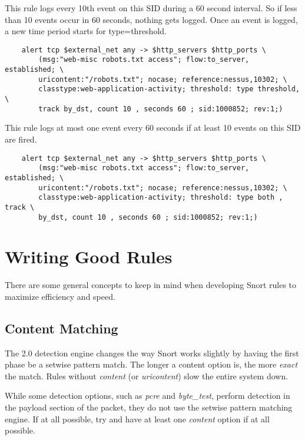 \documentclass[english]{report}
\begin{document}
This rule logs every 10th event on this SID during a 60 second interval. So if
less than 10 events occur in 60 seconds, nothing gets logged.  Once an event is
logged, a new time period starts for type=threshold.

\begin{verbatim}
    alert tcp $external_net any -> $http_servers $http_ports \
        (msg:"web-misc robots.txt access"; flow:to_server, established; \
        uricontent:"/robots.txt"; nocase; reference:nessus,10302; \
        classtype:web-application-activity; threshold: type threshold, \
        track by_dst, count 10 , seconds 60 ; sid:1000852; rev:1;)
\end{verbatim}

This rule logs at most one event every 60 seconds if at least 10 events on this
SID are fired.

\begin{verbatim}
    alert tcp $external_net any -> $http_servers $http_ports \
        (msg:"web-misc robots.txt access"; flow:to_server, established; \
        uricontent:"/robots.txt"; nocase; reference:nessus,10302; \
        classtype:web-application-activity; threshold: type both , track \
        by_dst, count 10 , seconds 60 ; sid:1000852; rev:1;)
\end{verbatim}

\section{Writing Good Rules}

There are some general concepts to keep in mind when developing Snort rules to
maximize efficiency and speed.

\subsection{Content Matching}

The 2.0 detection engine changes the way Snort works slightly by having the
first phase be a setwise pattern match.  The longer a content option is, the
more \emph{exact} the match.  Rules without \emph{content} (or
\emph{uricontent}) slow the entire system down.

While some detection options, such as \emph{pcre} and \emph{byte\_test},
perform detection in the payload section of the packet, they do not use the
setwise pattern matching engine.  If at all possible, try and have at least one
\emph{content} option if at all possible.
\end{document}
